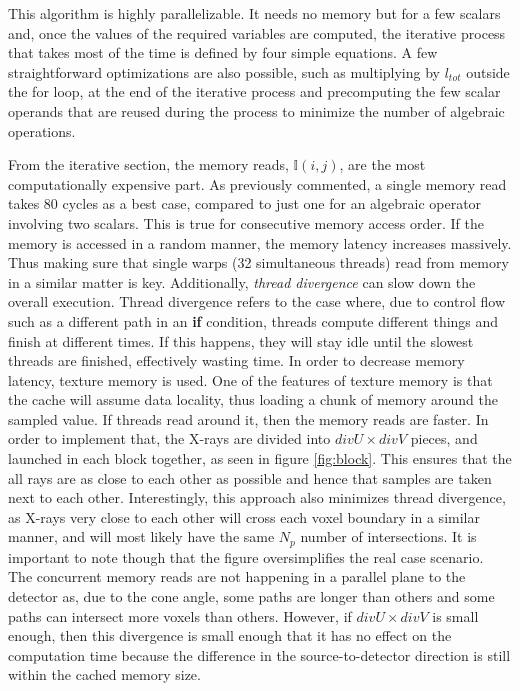 

This algorithm is highly parallelizable. It needs no memory but for a few scalars and, once the values of the required variables are computed, the iterative process that takes most of the time is defined by four simple equations. A few straightforward optimizations are also possible, such as multiplying by $l_{tot}$ outside the for loop, at the end of the iterative process and precomputing the few scalar operands that are reused during the process to minimize the number of algebraic operations.




From the iterative section, the memory reads, $\mathbb{I}(i,j)$, are the most computationally expensive part. As previously commented, a single memory read takes 80 cycles as a best case, compared to just one for an algebraic operator involving two scalars. This is true for consecutive memory access order. If the memory is accessed in a random manner, the memory latency increases massively. Thus making sure that single warps (32 simultaneous threads) read from memory in a similar matter is key. Additionally, \textit{thread divergence} can slow down the overall execution. Thread divergence refers to the case where, due to control flow such as a different path in an \textbf{if} condition, threads compute different things and finish at different times. If this happens, they will stay idle until the slowest threads are finished, effectively wasting time. In order to decrease memory latency, texture memory is used. One of the features of texture memory is that the cache will assume data locality, thus loading a chunk of memory around the sampled value. If threads read around it, then the memory reads are faster. In order to implement that, the X-rays are divided into $divU\times divV$ pieces, and launched in each block together, as seen in figure \ref{fig:block}. This ensures that the all rays are as close to each other as possible and hence that samples are taken next to each other. Interestingly, this approach also minimizes thread divergence, as X-rays very close to each other will cross each voxel boundary in a similar manner, and will most likely have the same $N_p$ number of intersections. It is important to note though that the figure oversimplifies the real case scenario. The concurrent memory reads are not happening in a parallel plane to the detector as, due to the cone angle, some paths are longer than others and some paths can intersect more voxels than others. However, if $divU\times divV$ is small enough, then this divergence is small enough that it has no effect on the computation time because the difference in the source-to-detector direction is still within the cached memory size.


